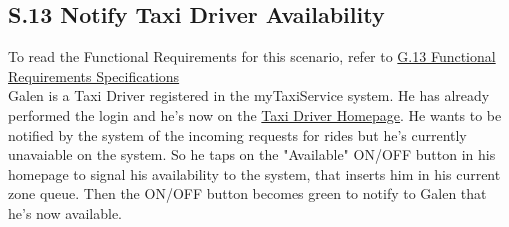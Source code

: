 		\subsection{S.13 Notify Taxi Driver Availability}\label{sec:TaxiDriverAvailabilityScenario}
		To read the Functional Requirements for this scenario, refer to \hyperref[sec:frs13]{G.13 Functional Requirements Specifications}\\

		Galen is a Taxi Driver registered in the myTaxiService system. He has already performed the login and he's now on the \hyperref[thomePage_m]{Taxi Driver Homepage}. He wants to be notified by the system of the incoming requests for rides but he's currently unavaiable on the system. So he taps on the "Available" ON/OFF button in his homepage to signal his availability to the system, that inserts him in his current zone queue. Then the ON/OFF button becomes green to notify to Galen that he's now available.